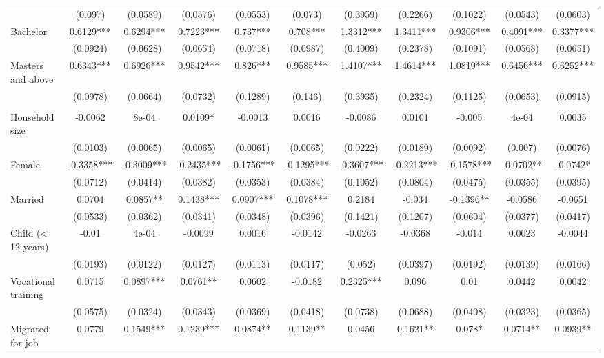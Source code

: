 \begin{table}[htbp]
{\begin{tabular}{lcccccccccc}
& (0.097) & (0.0589) & (0.0576) & (0.0553) & (0.073) & (0.3959) & (0.2266) & (0.1022) & (0.0543) & (0.0603) \\ 
\hspace{1em}Bachelor & 0.6129*** & 0.6294*** & 0.7223*** & 0.737*** & 0.708*** & 1.3312*** & 1.3411*** & 0.9306*** & 0.4091*** & 0.3377*** \\
& (0.0924) & (0.0628) & (0.0654) & (0.0718) & (0.0987) & (0.4009) & (0.2378) & (0.1091) & (0.0568) & (0.0651) \\ 
\hspace{1em}Masters and above & 0.6343*** & 0.6926*** & 0.9542*** & 0.826*** & 0.9585*** & 1.4107*** & 1.4614*** & 1.0819*** & 0.6456*** & 0.6252*** \\
& (0.0978) & (0.0664) & (0.0732) & (0.1289) & (0.146) & (0.3935) & (0.2324) & (0.1125) & (0.0653) & (0.0915) \\ 
\text{} &&&&&&&&&&\\
Household size & -0.0062 & 8e-04 & 0.0109* & -0.0013 & 0.0016 & -0.0086 & 0.0101 & -0.005 & 4e-04 & 0.0035 \\
& (0.0103) & (0.0065) & (0.0065) & (0.0061) & (0.0065) & (0.0222) & (0.0189) & (0.0092) & (0.007) & (0.0076) \\ 
Female & -0.3358*** & -0.3009*** & -0.2435*** & -0.1756*** & -0.1295*** & -0.3607*** & -0.2213*** & -0.1578*** & -0.0702** & -0.0742* \\
& (0.0712) & (0.0414) & (0.0382) & (0.0353) & (0.0384) & (0.1052) & (0.0804) & (0.0475) & (0.0355) & (0.0395) \\ 
Married & 0.0704 & 0.0857** & 0.1438*** & 0.0907*** & 0.1078*** & 0.2184 & -0.034 & -0.1396** & -0.0586 & -0.0651 \\
& (0.0533) & (0.0362) & (0.0341) & (0.0348) & (0.0396) & (0.1421) & (0.1207) & (0.0604) & (0.0377) & (0.0417) \\ 
Child (< 12 years) & -0.01 & 4e-04 & -0.0099 & 0.0016 & -0.0142 & -0.0263 & -0.0368 & -0.014 & 0.0023 & -0.0044 \\
& (0.0193) & (0.0122) & (0.0127) & (0.0113) & (0.0117) & (0.052) & (0.0397) & (0.0192) & (0.0139) & (0.0166) \\ 
Vocational training & 0.0715 & 0.0897*** & 0.0761** & 0.0602 & -0.0182 & 0.2325*** & 0.096 & 0.01 & 0.0442 & 0.0042 \\
& (0.0575) & (0.0324) & (0.0343) & (0.0369) & (0.0418) & (0.0738) & (0.0688) & (0.0408) & (0.0323) & (0.0365) \\ 
Migrated for job & 0.0779 & 0.1549*** & 0.1239*** & 0.0874** & 0.1139** & 0.0456 & 0.1621** & 0.078* & 0.0714** & 0.0939** \\

\end{tabular}}
\end{table}
